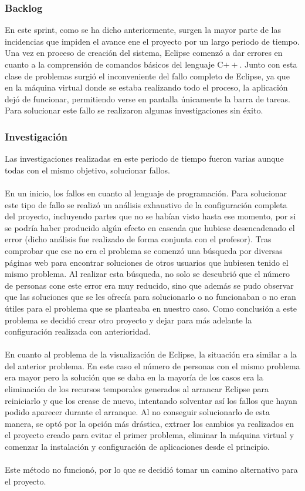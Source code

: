 \subsubsection{Backlog}
En este sprint, como se ha dicho anteriormente, surgen la mayor parte de las incidencias que impiden el avance ene el proyecto por un largo periodo de tiempo. Una vez en proceso de creación del sistema, Eclipse comenzó a dar errores en cuanto a la comprensión de comandos básicos del lenguaje C$++$. Junto con esta clase de problemas surgió el inconveniente del fallo completo de Eclipse, ya que en la máquina virtual donde se estaba realizando todo el proceso, la aplicación dejó de funcionar, permitiendo verse en pantalla únicamente la barra de tareas. Para solucionar este fallo se realizaron algunas investigaciones sin éxito.\\
\subsubsection{Investigación}
Las investigaciones realizadas en este periodo de tiempo fueron varias aunque todas con el mismo objetivo, solucionar fallos.\\
\\
En un inicio, los fallos en cuanto al lenguaje de programación. Para solucionar este tipo de fallo se realizó un análisis exhaustivo de la configuración completa  del proyecto, incluyendo partes que no se habían visto hasta ese momento, por si se podría haber producido algún efecto en cascada que hubiese desencadenado el error (dicho análisis fue realizado de forma conjunta con el profesor). Tras comprobar que ese no era el problema se comenzó una búsqueda por diversas páginas web para encontrar soluciones de otros usuarios que hubiesen tenido el mismo problema. Al realizar esta búsqueda, no solo se descubrió que el número de personas cone este error era muy reducido, sino que además se pudo observar que las soluciones que se les ofrecía para solucionarlo o no funcionaban o no eran útiles para el problema que se planteaba en nuestro caso. Como conclusión a este problema se decidió crear otro proyecto y dejar para más adelante la configuración realizada con anterioridad.\\
\\
En cuanto al problema de la visualización de Eclipse, la situación era similar a la del anterior problema. En este caso el número de personas con el mismo problema era mayor pero la solución que se daba en la mayoría de los casos era la eliminación de los recursos temporales generados al arrancar Eclipse para reiniciarlo y que los crease de nuevo, intentando solventar así los fallos que hayan podido aparecer durante el arranque. Al no conseguir solucionarlo de esta manera, se optó por la opción más drástica, extraer los cambios ya realizados en el proyecto creado para evitar el primer problema, eliminar la máquina virtual y comenzar la instalación y configuración de aplicaciones desde el principio.\\
\\
Este método no funcionó, por lo que se decidió tomar un camino alternativo para el proyecto.

